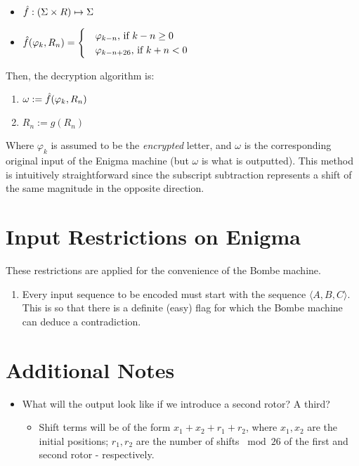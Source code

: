 \documentclass[12pt,a4paper]{article}
\begin{document}
	 \begin{itemize}
		\item $\hat{f}: (\Sigma \times R) \mapsto \Sigma$ 
		\item $\hat{f}(\varphi_k, R_n)= 					
					\begin{cases} 
						&\varphi_{k-n} \text{, if } {k-n} \geq 0 \\
						&\varphi_{k-n+26} \text{, if }{k+n} < 0
					\end{cases}
			  $ 
	\end{itemize}

	Then, the decryption algorithm is:
	

	\begin{enumerate}
		\item $\omega := \hat{f}(\varphi_k, R_n)$
		\item $R_n := g(R_n)$
	\end{enumerate}

	Where $\varphi_k$ is assumed to be the \emph{encrypted} letter, and $\omega$ is the corresponding original input of the Enigma machine (but $\omega$ is what is outputted). This method is intuitively straightforward since the subscript subtraction represents a shift of the same magnitude in the opposite direction. \\

	

	\section{Input Restrictions on Enigma}
	These restrictions are applied for the convenience of the Bombe machine.

	\begin{enumerate}
		\item Every input sequence to be encoded must start with the sequence $\langle A, B, C \rangle$.
		This is so that there is a definite (easy) flag for which the Bombe machine can deduce a contradiction.
		
	\end{enumerate}
	
			
	\section{Additional Notes}
		\begin{itemize}
			\item What will the output look like if we introduce a second rotor? A third?
			
			\begin{itemize}
				\item Shift terms will be of the form $x_1 + x_2 + r_1 + r_2$, where $x_1, x_2$ are the initial positions; $r_1, r_2$ are the number of shifts $\bmod{ 26}$ of the first and second rotor - respectively.
			\end{itemize}					
			
		\end{itemize}
\end{document}
